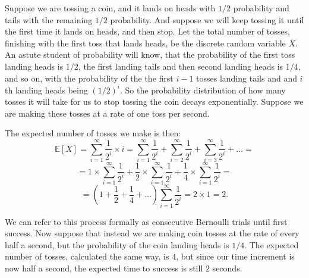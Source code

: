 \documentclass{article}
\begin{document}
\noindent Suppose we are tossing a coin, and it lands on heads with $1/2$ probability and tails with the remaining $1/2$ probability. And suppose we will keep tossing it until the first time it lands on heads, and then stop. Let the total number of tosses, finishing with the first toss that lands heads, be the discrete random variable $X$. An astute student of probability will know, that the probability of the first toss landing heads is $1/2$, the first landing tails and then second landing heads is $1/4$, and so on, with the probability of the the first $i-1$ tosses landing tails and and $i$th landing heads being $(1/2)^i$. So the probability distribution of how many tosses it will take for us to stop tossing the coin decays exponentially. Suppose we are making these tosses at a rate of one toss per second.

\begin{figure}[ht!]
    \centering
\end{figure}

\noindent The expected number of tosses we make is then: $$\mathbb{E}[X]=\sum_{i=1}^{\infty}\frac{1}{2^i}\times i=\sum_{i=1}^{\infty}\frac{1}{2^i}+\sum_{i=2}^{\infty}\frac{1}{2^i}+\sum_{i=3}^{\infty}\frac{1}{2^i}+\dots=$$ $$=1\times\sum_{i=1}^{\infty}\frac{1}{2^i}+\frac{1}{2}\times\sum_{i=1}^{\infty}\frac{1}{2^i}+\frac{1}{4}\times\sum_{i=1}^{\infty}\frac{1}{2^i}  =$$ $$=\left(1+\frac{1}{2}+\frac{1}{4}+\dots\right)\sum_{i=1}^{\infty}\frac{1}{2^i}=2\times 1 =2.$$

\noindent We can refer to this process formally as consecutive Bernoulli trials until first success. Now suppose that instead we are making coin tosses at the rate of every half a second, but the probability of the coin landing heads is $1/4$. The expected number of tosses, calculated the same way, is $4$, but since our time increment is now half a second, the expected time to success is still $2$ seconds.
\end{document}
